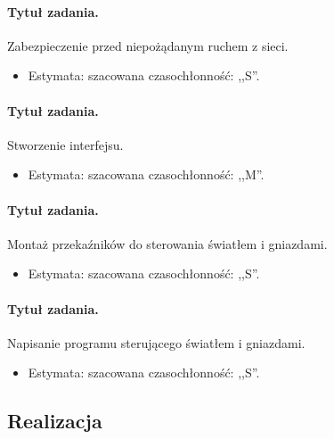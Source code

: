 	\paragraph{Tytuł zadania.} Zabezpieczenie przed niepożądanym ruchem z sieci.
	\begin{itemize}
		\item Estymata: szacowana czasochłonność: ,,S''.
	\end{itemize}
	
	\paragraph{Tytuł zadania.} Stworzenie interfejsu.
	\begin{itemize}
		\item Estymata: szacowana czasochłonność: ,,M''.
	\end{itemize}
	
	\paragraph{Tytuł zadania.} Montaż przekaźników do sterowania światłem i gniazdami.
	\begin{itemize}
		\item Estymata: szacowana czasochłonność: ,,S''.
	\end{itemize}
	
	\paragraph{Tytuł zadania.} Napisanie programu sterującego światłem i gniazdami.
	\begin{itemize}
		\item Estymata: szacowana czasochłonność: ,,S''.
	\end{itemize}


	\subsection{Realizacja}
	
